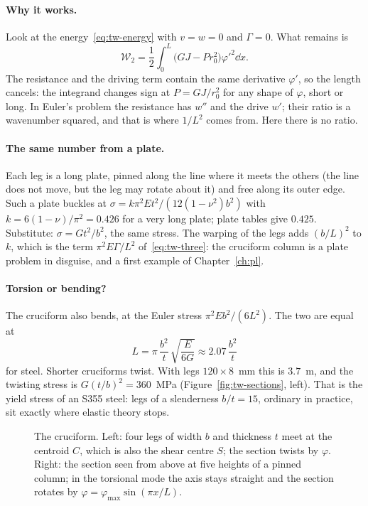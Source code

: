 \paragraph{Why it works.}
Look at the energy~\eqref{eq:tw-energy} with $v = w = 0$ and $\Gamma = 0$. What remains is
\[
  \mathcal{W}_2 = \frac12\int_0^L\bigl(GJ - Pr_0^2\bigr)\varphi'^2\dd x .
\]
The resistance and the driving term contain the
same derivative $\varphi'$, so the length cancels: the integrand changes sign at $P = GJ/r_0^2$ for any
shape of $\varphi$, short or long. In Euler's problem the resistance has $w''$ and the drive $w'$; their
ratio is a wavenumber squared, and that is where $1/L^2$ comes from. Here there is no ratio.

\paragraph{The same number from a plate.}
Each leg is a long plate, pinned along the line where it meets the others (the line does not move,
but the leg may rotate about it) and free along its outer edge. Such a plate buckles at
$\sigma = k\pi^2E t^2/(12(1-\nu^2)b^2)$ with $k = 6(1-\nu)/\pi^2 = 0.426$ for a very long plate;
plate tables give $0.425$. Substitute: $\sigma = Gt^2/b^2$, the same stress. The warping of the legs adds
$(b/L)^2$ to $k$, which is the term $\pi^2E\Gamma/L^2$ of~\eqref{eq:tw-three}: the cruciform column is a
plate problem in disguise, and a first example of Chapter~\ref{ch:pl}.

\paragraph{Torsion or bending?}
The cruciform also bends, at the Euler stress $\pi^2Eb^2/(6L^2)$. The two are equal at
\begin{equation}\label{eq:tw-crossover}
  L = \pi\,\frac{b^2}{t}\,\sqrt{\frac{E}{6G}} \approx 2.07\,\frac{b^2}{t}
\end{equation}
for steel. Shorter cruciforms twist. With legs $120\times8$~mm this is $3.7$~m, and the twisting stress is
$G(t/b)^2 = 360$~MPa (Figure~\ref{fig:tw-sections}, left). That is the yield stress of an S355 steel: legs
of a slenderness $b/t = 15$, ordinary in practice, sit exactly where elastic theory stops.

\begin{figure}[ht]
  \centering
  
  \caption{The cruciform. Left: four legs of width $b$ and thickness $t$ meet at the centroid $C$, which
    is also the shear centre $S$; the section twists by $\varphi$. Right: the section seen from above at five
    heights of a pinned column; in the torsional mode the axis stays straight and the section rotates by
    $\varphi = \varphi_{\max}\sin(\pi x/L)$.}
  \label{fig:tw-cruciform-sketch}
\end{figure}

